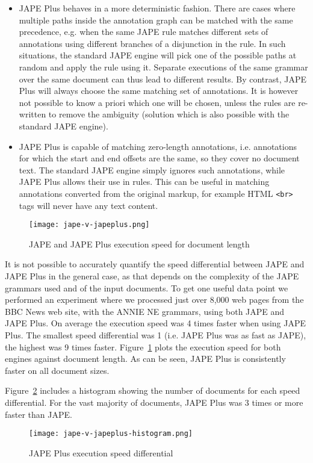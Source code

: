 \begin{itemize}
  \item JAPE Plus behaves in a more deterministic fashion. There are cases where
  multiple paths inside the annotation graph can be matched with the same
  precedence, e.g. when the same JAPE rule matches different sets of annotations
  using different branches of a disjunction in the rule. In such situations, the
  standard JAPE engine will pick one of the possible paths at random and apply
  the rule using it. Separate executions of the same grammar over the same
  document can thus lead to different results. By contrast, JAPE Plus will
  always choose the same matching set of annotations. It is however not possible
  to know a priori which one will be chosen, unless the rules are re-written to
  remove the ambiguity (solution which is also possible with the standard JAPE
  engine).
  \item JAPE Plus is capable of matching zero-length annotations, i.e. 
  annotations for which the start and end offsets are the same, so they cover 
  no document text. The standard JAPE engine simply ignores such annotations,
  while JAPE Plus allows their use in rules. This can be useful in matching
  annotations converted from the original markup, for example HTML \verb!<br>! 
  tags will never have any text content.
\end{itemize}  
 
\begin{figure}[htb]
\begin{center}
\texttt{[image: jape-v-japeplus.png]}
\caption{JAPE and JAPE Plus execution speed for document length}
\label{fig:jape:plus-speed}
\end{center}
\end{figure}

It is not possible to accurately quantify the speed differential between JAPE
and JAPE Plus in the general case, as that depends on the complexity of the JAPE
grammars used and of the input documents. To get one useful data point we
performed an experiment where we processed just over 8,000 web pages from the
BBC News web site, with the ANNIE NE grammars, using both JAPE and JAPE Plus. On
average the execution speed was 4 times faster when using JAPE Plus. The
smallest speed differential was 1 (i.e. JAPE Plus was as fast as JAPE), the
highest was 9 times faster. Figure~\ref{fig:jape:plus-speed} plots the execution
speed for both engines against document length. As can be seen, JAPE Plus is
consistently faster on all document sizes. 

Figure~\ref{fig:jape:plus-histogram} includes a histogram showing the number of
documents for each speed differential. For the vast majority of documents, JAPE
Plus was 3 times or more faster than JAPE.

\begin{figure}[htb]
\begin{center}
\texttt{[image: jape-v-japeplus-histogram.png]}
\caption{JAPE Plus execution speed differential}
\label{fig:jape:plus-histogram}
\end{center}
\end{figure}
 
